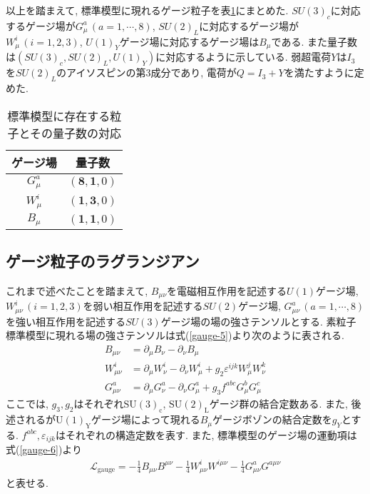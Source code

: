 以上を踏まえて, 標準模型に現れるゲージ粒子を表\ref{table:Gauge_particle}にまとめた.
$SU(3)_c$に対応するゲージ場が$G_\mu^a\,(a=1,\cdots,8)$, $SU(2)_L$に対応するゲージ場が$W_\mu^i\,(i=1,2,3)$, $U(1)_Y$ゲージ場に対応するゲージ場は$B_\mu$である.
また量子数は$\left(SU(3)_c, SU(2)_L, U(1)_Y\right)$に対応するように示している.
弱超電荷$Y$は$I_3$を$SU(2)_L$のアイソスピンの第3成分であり, 電荷が$Q=I_3+Y$を満たすように定めた. 
\begin{table}[ht]
  \centering
  \begin{tabular}{cc}\hline
    ゲージ場 & 量子数\\\hline\hline
    $G_\mu^a $ & $(\bm{8}, \bm{1}, 0 )$ \\
    $W_\mu^i $ & $(\bm{1}, \bm{3}, 0 )$ \\
    $B_\mu   $ & $(\bm{1}, \bm{1}, 0 )$\\\hline
  \end{tabular}
  \label{table:Gauge_particle}
  \caption{標準模型に存在する粒子とその量子数の対応}
\end{table}
\subsection{ゲージ粒子のラグランジアン}
これまで述べたことを踏まえて, $B_{\mu\nu}$を電磁相互作用を記述する$U(1)$ゲージ場, $W_{\mu\nu}^i\,(i=1,2,3)$を弱い相互作用を記述する$SU(2)$ゲージ場, $G_{\mu\nu}^a\,(a=1,\cdots,8)$を強い相互作用を記述する$SU(3)$ゲージ場の場の強さテンソルとする.
素粒子標準模型に現れる場の強さテンソルは式(\ref{gauge-5})より次のように表される.
\begin{align}
  B_{\mu\nu} &= \partial_\mu B_\nu - \partial_\nu B_\mu \label{gauge.B}\\
  W_{\mu\nu}^i &= \partial_\mu W_\nu^i - \partial_\nu W_\mu^i+g_2\varepsilon^{ijk}W_\mu^j W_\nu^k \label{gauge.W}\\
  G_{\mu\nu}^a &= \partial_\mu G_\nu^a - \partial_\nu G_\mu^a +g_3 f^{abc}G_\mu^b G_\mu^c\label{gauge.G}
\end{align}
ここでは, $g_3, g_2$はそれぞれ$\mathrm{SU}(3)_\mathrm{c}$, $\mathrm{SU}(2)_\mathrm{L}$ゲージ群の結合定数ある.
また, 後述されるが$\mathrm{U(1)}_{\mathrm {Y}}$ゲージ場によって現れる$B_\mu$ゲージボゾンの結合定数を$g_Y$とする.
$f^{abc}, \varepsilon_{ijk} $はそれぞれの構造定数を表す.
また, 標準模型のゲージ場の運動項は式(\ref{gauge-6})より
\begin{align}
  \mathcal{L}_{\text{gauge}} = -\frac{1}{4}B_{\mu\nu} B^{\mu\nu} - \frac{1}{4}W_{\mu\nu}^i W^{i\mu\nu} -\frac{1}{4}G_{\mu\nu}^a G^{a\mu\nu}\label{gauge.kin}
\end{align}
と表せる.
